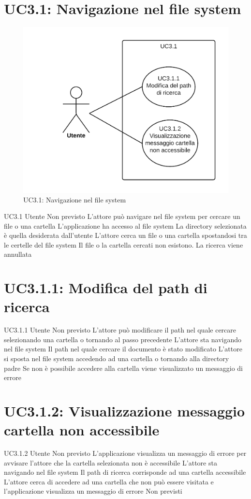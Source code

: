 \documentclass[../AnalisideiRequisiti.tex]{subfiles}
\begin{document}
	\section{UC3.1: Navigazione nel file system}
	\begin{figure}[H]
		\centering
		\includegraphics[width=\textwidth]{../img/UC3_1.png}
		\caption{UC3.1: Navigazione nel file system}
	\end{figure}
	\UserCase
	{UC3.1}
	{Utente}
	{Non previsto}
	{L'attore può navigare nel file system per cercare un file o una cartella}
	{L'applicazione ha accesso al file system}
	{La directory selezionata è quella desiderata dall'utente}
	{
		L'attore cerca un file o una cartella spostandosi tra le
		certelle del file system
	}
	{Il file o la cartella cercati non esistono. La ricerca viene annullata}	
	
	\section{UC3.1.1: Modifica del path di ricerca}
	\UserCase
	{UC3.1.1}
	{Utente}
	{Non previsto}
	{L'attore può modificare il path nel quale cercare selezionando una cartella o tornando al passo precedente}
	{L'attore sta navigando nel file system }
	{Il path nel quale cercare il documento è stato modificato}
	{L'attore si sposta nel file system accedendo ad una cartella o tornando alla directory padre}
	{Se non è possibile accedere alla cartella viene visualizzato un messaggio di errore }
	
	\section{UC3.1.2: Visualizzazione messaggio cartella non accessibile}
	\UserCase
	{UC3.1.2}
	{Utente}
	{Non previsto}
	{L'applicazione visualizza un messaggio di errore per avvisare l'attore che la cartella selezionata non è accessibile}
	{L'attore sta navigando nel file system }
	{Il path di ricerca corrisponde ad una cartella accessibile}
	{L'attore cerca di accedere ad una cartella che non può essere visitata e l'applicazione visualizza un messaggio di errore}
	{Non previsti}
\end{document}
